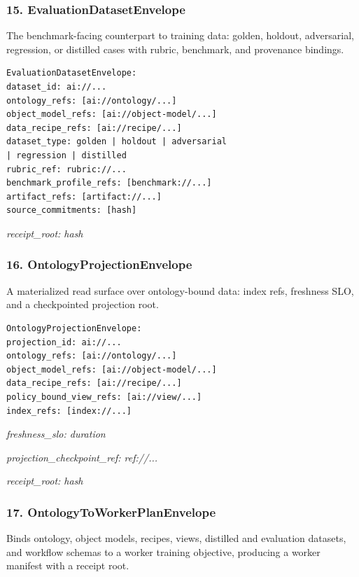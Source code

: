 \documentclass[
  11pt,
]{article}
\begin{document}
\hypertarget{evaluationdatasetenvelope}{%
\subsubsection{15.
EvaluationDatasetEnvelope}\label{evaluationdatasetenvelope}}

The benchmark-facing counterpart to training data: golden, holdout,
adversarial, regression, or distilled cases with rubric, benchmark, and
provenance bindings.

\begin{lstlisting}[language={},basicstyle=\ttfamily\scriptsize]
EvaluationDatasetEnvelope:
dataset_id: ai://...
ontology_refs: [ai://ontology/...]
object_model_refs: [ai://object-model/...]
data_recipe_refs: [ai://recipe/...]
dataset_type: golden | holdout | adversarial
| regression | distilled
rubric_ref: rubric://...
benchmark_profile_refs: [benchmark://...]
artifact_refs: [artifact://...]
source_commitments: [hash]
\end{lstlisting}
\emph{receipt\_root: hash}

\hypertarget{ontologyprojectionenvelope}{%
\subsubsection{16.
OntologyProjectionEnvelope}\label{ontologyprojectionenvelope}}

A materialized read surface over ontology-bound data: index refs,
freshness SLO, and a checkpointed projection root.

\begin{lstlisting}[language={},basicstyle=\ttfamily\scriptsize]
OntologyProjectionEnvelope:
projection_id: ai://...
ontology_refs: [ai://ontology/...]
object_model_refs: [ai://object-model/...]
data_recipe_refs: [ai://recipe/...]
policy_bound_view_refs: [ai://view/...]
index_refs: [index://...]
\end{lstlisting}
\emph{freshness\_slo: duration}

\emph{projection\_checkpoint\_ref: ref://...}

\emph{receipt\_root: hash}

\hypertarget{ontologytoworkerplanenvelope}{%
\subsubsection{17.
OntologyToWorkerPlanEnvelope}\label{ontologytoworkerplanenvelope}}

Binds ontology, object models, recipes, views, distilled and evaluation
datasets, and workflow schemas to a worker training objective, producing
a worker manifest with a receipt root.
\end{document}
